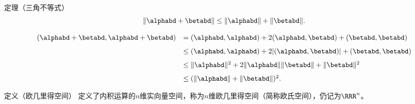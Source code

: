 \begin{frame}
  \begin{footnotesize}
    \begin{block}{定理（三角不等式）}
      $$
      \|\alphabd+\betabd\|\le\|\alphabd\|+\|\betabd\|.
      $$
    \end{block}
    \pause\proofname
    $$
    \begin{array}{rl}
      (\alphabd+\betabd,\alphabd+\betabd)
      &= (\alphabd,\alphabd)+2(\alphabd,\betabd)+(\betabd,\betabd)\\[0.1in]
      &\le (\alphabd,\alphabd)+2|(\alphabd,\betabd)|+(\betabd,\betabd) \\[0.1in]
      &\le \|\alphabd\|^2+2\|\alphabd\|\|\betabd\|+\|\betabd\|^2 \\[0.1in]
      &\le (\|\alphabd\|+\|\betabd\|)^2.
    \end{array}
    $$
  \end{footnotesize}
\end{frame}


\begin{frame}
  \begin{footnotesize}
    \begin{block}{定义（欧几里得空间）}
      定义了内积运算的$n$维实向量空间，称为$n$维欧几里得空间（简称欧氏空间），仍记为$\RRR^n$。
    \end{block}
  \end{footnotesize}
\end{frame}

\begin{frame}
  \begin{footnotesize}
    
  \end{footnotesize}
\end{frame}


\begin{frame}
  \begin{footnotesize}
    
  \end{footnotesize}
\end{frame}


\begin{frame}
  \begin{footnotesize}
    
  \end{footnotesize}
\end{frame}


\begin{frame}
  \begin{footnotesize}
    
  \end{footnotesize}
\end{frame}
